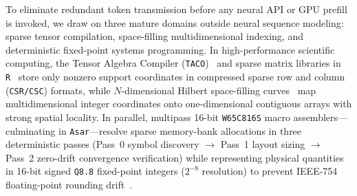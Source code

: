 \documentclass[11pt]{article}
\theoremstyle{plain}
\theoremstyle{definition}
\begin{document}
To eliminate redundant token transmission before any neural API or GPU prefill is invoked, we draw on three mature domains outside neural sequence modeling: sparse tensor compilation, space-filling multidimensional indexing, and deterministic fixed-point systems programming. In high-performance scientific computing, the Tensor Algebra Compiler (\texttt{TACO})~\cite{kjolstad2017taco} and sparse matrix libraries in \texttt{R}~\cite{ihaka1996r,bates2000matrix} store only nonzero support coordinates in compressed sparse row and column (\texttt{CSR/CSC}) formats, while $N$-dimensional Hilbert space-filling curves~\cite{hilbert1891,moon2001hilbert} map multidimensional integer coordinates onto one-dimensional contiguous arrays with strong spatial locality. In parallel, multipass 16-bit \texttt{W65C816S} macro assemblers---culminating in \texttt{Asar}---resolve sparse memory-bank allocations in three deterministic passes (Pass~0 symbol discovery $\to$ Pass~1 layout sizing $\to$ Pass~2 zero-drift convergence verification) while representing physical quantities in 16-bit signed \texttt{Q8.8} fixed-point integers ($2^{-8}$ resolution) to prevent IEEE-754 floating-point rounding drift~\cite{goldberg1991float}.
\end{document}
